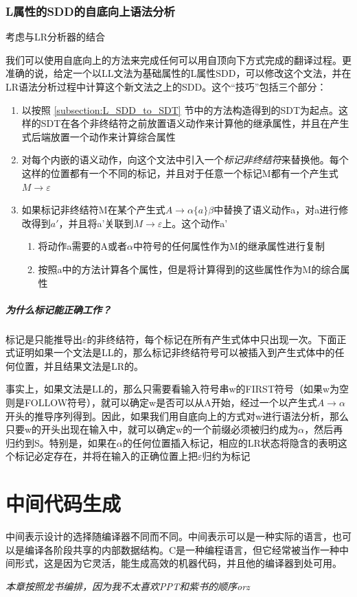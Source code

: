 \documentclass[]{report}
\begin{document}
		\subsection{L属性的SDD的自底向上语法分析}
		考虑与LR分析器的结合\par
		我们可以使用自底向上的方法来完成任何可以用自顶向下方式完成的翻译过程。更准确的说，给定一个以LL文法为基础属性的L属性SDD，可以修改这个文法，并在LR语法分析过程中计算这个新文法之上的SDD。这个“技巧”包括三个部分：
		\begin{enumerate}
			\item 以按照 \ref{subsection:L_SDD_to_SDT} 节中的方法构造得到的SDT为起点。这样的SDT在各个非终结符之前放置语义动作来计算他的继承属性，并且在产生式后端放置一个动作来计算综合属性
			\item 对每个内嵌的语义动作，向这个文法中引入一个\textit{标记非终结符}来替换他。每个这样的位置都有一个不同的标记，并且对于任意一个标记M都有一个产生式$M\to\varepsilon$
			\item 如果标记非终结符M在某个产生式$A\to\alpha\{a\}\beta$中替换了语义动作a，对a进行修改得到$a'$，并且将a'关联到$M\to\varepsilon$上。这个动作a'
			\begin{enumerate}
				\item 将动作a需要的A或者$\alpha$中符号的任何属性作为M的继承属性进行复制
				\item 按照a中的方法计算各个属性，但是将计算得到的这些属性作为M的综合属性
			\end{enumerate}
		\end{enumerate}
		\paragraph{为什么标记能正确工作？}
		标记是只能推导出$\varepsilon$的非终结符，每个标记在所有产生式体中只出现一次。下面正式证明如果一个文法是LL的，那么标记非终结符号可以被插入到产生式体中的任何位置，并且结果文法是LR的。\par
		事实上，如果文法是LL的，那么只需要看输入符号串w的FIRST符号（如果w为空则是FOLLOW符号），就可以确定w是否可以从A开始，经过一个以产生式$A\to\alpha$开头的推导序列得到。因此，如果我们用自底向上的方式对w进行语法分析，那么只要w的开头出现在输入中，就可以确定w的一个前缀必须被归约成为$\alpha$，然后再归约到S。特别是，如果在$\alpha$的任何位置插入标记，相应的LR状态将隐含的表明这个标记必定存在，并将在输入的正确位置上把$\varepsilon$归约为标记

	\chapter{中间代码生成}
	中间表示设计的选择随编译器不同而不同。中间表示可以是一种实际的语言，也可以是编译各阶段共享的内部数据结构。C是一种编程语言，但它经常被当作一种中间形式，这是因为它灵活，能生成高效的机器代码，并且他的编译器到处可用。\par
	\textit{本章按照龙书编排，因为我不太喜欢PPT和紫书的顺序orz}
\end{document}
